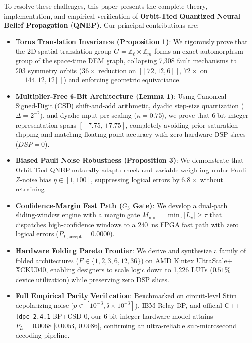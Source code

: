 \documentclass[journal]{IEEEtran}
\begin{document}
To resolve these challenges, this paper presents the complete theory, implementation, and empirical verification of \textbf{Orbit-Tied Quantized Neural Belief Propagation (QNBP)}. Our principal contributions are:
\begin{itemize}
    \item \textbf{Torus Translation Invariance (Proposition 1)}: We rigorously prove that the 2D spatial translation group $G = \mathbb{Z}_\ell \times \mathbb{Z}_m$ forms an exact automorphism group of the space-time DEM graph, collapsing 7,308 fault mechanisms to 203 symmetry orbits ($36\times$ reduction on $[[72,12,6]]$, $72\times$ on $[[144,12,12]]$) and enforcing geometric equivariance.
    \item \textbf{Multiplier-Free 6-Bit Architecture (Lemma 1)}: Using Canonical Signed-Digit (CSD) shift-and-add arithmetic, dyadic step-size quantization ($\Delta = 2^{-2}$), and dyadic input pre-scaling ($\kappa = 0.75$), we prove that 6-bit integer representation spans $[-7.75, +7.75]$, completely avoiding prior saturation clipping and matching floating-point accuracy with zero hardware DSP slices ($DSP=0$).
    \item \textbf{Biased Pauli Noise Robustness (Proposition 3)}: We demonstrate that Orbit-Tied QNBP naturally adapts check and variable weighting under Pauli $Z$-noise bias $\eta \in [1, 100]$, suppressing logical errors by $6.8\times$ without retraining.
    \item \textbf{Confidence-Margin Fast Path ($G_3$ Gate)}: We develop a dual-path sliding-window engine with a margin gate $M_{\min} = \min_{v} |L_v| \ge \tau$ that dispatches high-confidence windows to a 240~ns FPGA fast path with zero logical errors ($P_{L, \text{accept}} = 0.0000$).
    \item \textbf{Hardware Folding Pareto Frontier}: We derive and synthesize a family of folded architectures ($F \in \{1, 2, 3, 6, 12, 36\}$) on AMD Kintex UltraScale+ XCKU040, enabling designers to scale logic down to 1,226 LUTs ($0.51\%$ device utilization) while preserving zero DSP slices.
    \item \textbf{Full Empirical Parity Verification}: Benchmarked on circuit-level Stim depolarizing noise ($p \in [10^{-3}, 5\times 10^{-3}]$), IBM Relay-BP, and official C++ \texttt{ldpc 2.4.1} BP+OSD-0, our 6-bit integer hardware model attains $P_L = 0.0068$ [0.0053, 0.0086], confirming an ultra-reliable sub-microsecond decoding pipeline.
\end{itemize}
\end{document}
